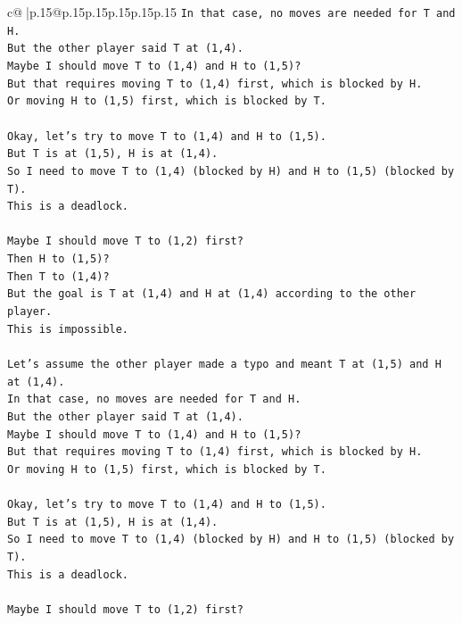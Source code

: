 \documentclass{article}
\begin{document}
{\begin{supertabular}{c@{$\;$}|p{.15\linewidth}@{}p{.15\linewidth}p{.15\linewidth}p{.15\linewidth}p{.15\linewidth}p{.15\linewidth}}
{{{\texttt{In that case, no moves are needed for T and H.} \\
\texttt{But the other player said T at (1,4).} \\
\texttt{Maybe I should move T to (1,4) and H to (1,5)?} \\
\texttt{But that requires moving T to (1,4) first, which is blocked by H.} \\
\texttt{Or moving H to (1,5) first, which is blocked by T.} \\
\\ 
\texttt{Okay, let's try to move T to (1,4) and H to (1,5).} \\
\texttt{But T is at (1,5), H is at (1,4).} \\
\texttt{So I need to move T to (1,4) (blocked by H) and H to (1,5) (blocked by T).} \\
\texttt{This is a deadlock.} \\
\\ 
\texttt{Maybe I should move T to (1,2) first?} \\
\texttt{Then H to (1,5)?} \\
\texttt{Then T to (1,4)?} \\
\texttt{But the goal is T at (1,4) and H at (1,4) according to the other player.} \\
\texttt{This is impossible.} \\
\\ 
\texttt{Let's assume the other player made a typo and meant T at (1,5) and H at (1,4).} \\
\texttt{In that case, no moves are needed for T and H.} \\
\texttt{But the other player said T at (1,4).} \\
\texttt{Maybe I should move T to (1,4) and H to (1,5)?} \\
\texttt{But that requires moving T to (1,4) first, which is blocked by H.} \\
\texttt{Or moving H to (1,5) first, which is blocked by T.} \\
\\ 
\texttt{Okay, let's try to move T to (1,4) and H to (1,5).} \\
\texttt{But T is at (1,5), H is at (1,4).} \\
\texttt{So I need to move T to (1,4) (blocked by H) and H to (1,5) (blocked by T).} \\
\texttt{This is a deadlock.} \\
\\ 
\texttt{Maybe I should move T to (1,2) first?} \\
}}}
\end{supertabular}}
\end{document}
